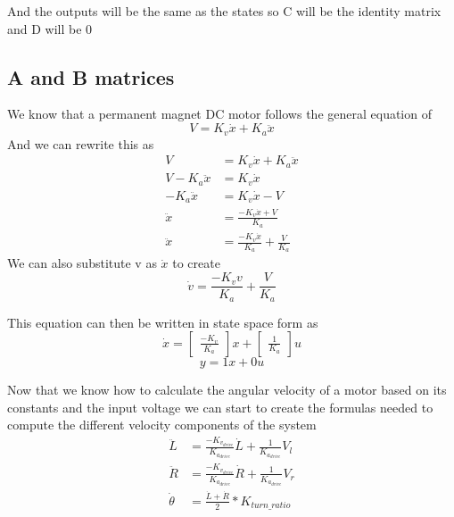 \documentclass{scrartcl}
\begin{document}
And the outputs will be the same as the states so C will be the identity matrix and D will be 0

\subsection{A and B matrices}
We know that a permanent magnet DC motor follows the general equation of
\begin{equation}
    V = K_v\dot{x} + K_a\ddot{x}
\end{equation}
And we can rewrite this as
\begin{align*}
    V               & = K_v\dot{x} + K_a\ddot{x}                \\
    V - K_a\ddot{x} & = K_v\dot{x}                              \\
    -K_a\ddot{x}    & = K_v\dot{x} - V                          \\
    \ddot{x}        & = \frac{-K_v\dot{x} + V}{K_a}             \\
    \ddot{x}        & = \frac{-K_v\dot{x}}{K_a} + \frac{V}{K_a}
\end{align*}
We can also substitute v as \(\dot{x}\) to create
\begin{equation}
    \dot{v} = \frac{-K_v v}{K_a} + \frac{V}{K_a}
\end{equation}

This equation can then be written in state space form as
\begin{equation}
    \dot{x} = \begin{bmatrix}\frac{-K_v}{K_a}\end{bmatrix}x + \begin{bmatrix}\frac{1}{K_a}\end{bmatrix}u
\end{equation}
\begin{equation}
    y = 1x + 0u
\end{equation}

Now that we know how to calculate the angular velocity of a motor based on its constants and the input voltage we can start to create the formulas needed to compute the different velocity components of the system
\begin{align}
    \ddot{L}     & = \frac{-K_{v_\mathit{drive}}}{K_{a_\mathit{drive}}}\dot{L} + \frac{1}{K_{a_\mathit{drive}}}V_l \\
    \ddot{R}     & = \frac{-K_{v_\mathit{drive}}}{K_{a_\mathit{drive}}}\dot{R} + \frac{1}{K_{a_\mathit{drive}}}V_r \\
    \dot{\theta} & = \frac{\dot{L} + \dot{R}}{2} * K_\mathit{turn\_ratio}
\end{align}
\end{document}
